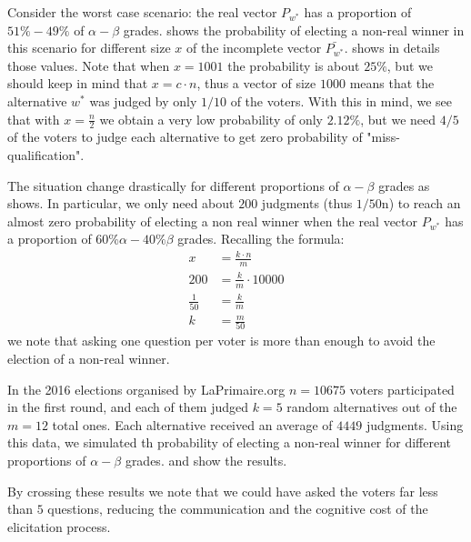 \documentclass[version=3.21, pagesize, twoside=off, bibliography=totoc, DIV=calc, fontsize=12pt, a4paper]{scrartcl}
\begin{document}
Consider the worst case scenario: the real vector $P_{w^*}$ has a proportion of $51\%-49\%$ of $\alpha-\beta$ grades.  shows the probability of electing a non-real winner in this scenario for different size $x$ of the incomplete vector $\bar{P_{w^*}}$.  shows in details those values. Note that when $x=1001$ the probability is about $25\%$, but we should keep in mind that $x= c \cdot n$, thus a vector of size $1000$ means that the alternative $w^*$ was judged by only $1/10$ of the voters. With this in mind, we see that with $x=\frac{n}{2}$ we obtain a very low probability of only $2.12\%$, but we need $4/5$ of the voters to judge each alternative to get zero probability of "miss-qualification".

The situation change drastically for different proportions of $\alpha-\beta$ grades as  shows. In particular, we only need about $200$ judgments (thus $1/50$n) to reach an almost zero probability of electing a non real winner when the real vector $P_{w^*}$ has a proportion of $60\% \alpha -40\% \beta$ grades. Recalling the formula:
\begin{align}
	x&=\frac{k \cdot n}{m} \\
	200&=\frac{k}{m}\cdot 10000 \\
	\frac{1}{50}&=\frac{k}{m} \\
	k&=\frac{m}{50}
\end{align}
we note that asking one question per voter is more than enough to avoid the election of a non-real winner.

In the 2016 elections organised by LaPrimaire.org $n=10675$ voters participated in the first round, and each of them judged $k=5$ random alternatives out of the $m=12$ total ones. Each alternative received an average of $4449$ judgments. Using this data, we simulated th probability of electing a non-real winner for different proportions of $\alpha-\beta$ grades.  and  show the results.

By crossing these results we note that we could have asked the voters far less than $5$ questions, reducing the communication and the cognitive cost of the elicitation process.
\end{document}
